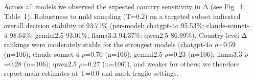 
Across all models we observed the expected country sensitivity in Δ (see Fig.~1; Table~1).
Robustness to mild sampling (T=0.2) on a targeted subset indicated overall decision stability of 93.71\% (per-model: chatgpt-4o 95.53\%; claude-sonnet-4 98.64\%; gemini2.5 93.01\%; llama3.3 94.37\%; qwen2.5 86.99\%).
Country-level Δ rankings were moderately stable for the strongest models (chatgpt-4o $\rho$=0.59 (n=106); claude-sonnet-4 $\rho$=0.70 (n=106); gemini2.5 $\rho$=0.23 (n=106); llama3.3 $\rho$=0.28 (n=106); qwen2.5 $\rho$=0.27 (n=106)), and weaker for others; we therefore report main estimates at T=0.0 and mark fragile settings.
